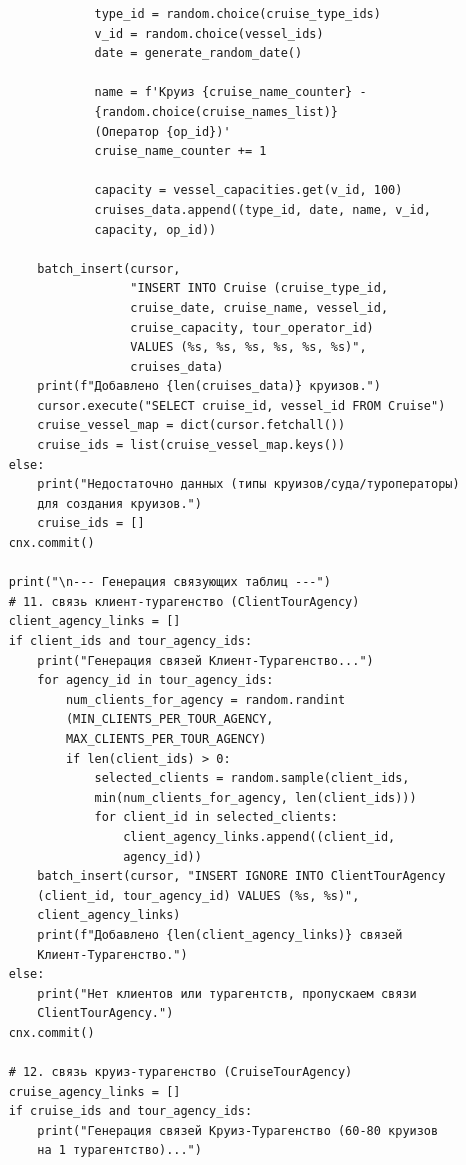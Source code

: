 \documentclass[11pt,a4paper,final]{article}
\begin{document}
{\begin{verbatim}
                type_id = random.choice(cruise_type_ids)
                v_id = random.choice(vessel_ids)
                date = generate_random_date()

                name = f'Круиз {cruise_name_counter} -
                {random.choice(cruise_names_list)} 
                (Оператор {op_id})'
                cruise_name_counter += 1

                capacity = vessel_capacities.get(v_id, 100)
                cruises_data.append((type_id, date, name, v_id, 
                capacity, op_id))

        batch_insert(cursor,
                     "INSERT INTO Cruise (cruise_type_id,
                     cruise_date, cruise_name, vessel_id,
                     cruise_capacity, tour_operator_id)
                     VALUES (%s, %s, %s, %s, %s, %s)",
                     cruises_data)
        print(f"Добавлено {len(cruises_data)} круизов.")
        cursor.execute("SELECT cruise_id, vessel_id FROM Cruise")
        cruise_vessel_map = dict(cursor.fetchall())
        cruise_ids = list(cruise_vessel_map.keys())
    else:
        print("Недостаточно данных (типы круизов/суда/туроператоры)
        для создания круизов.")
        cruise_ids = []
    cnx.commit()

    print("\n--- Генерация связующих таблиц ---")
    # 11. связь клиент-турагенство (ClientTourAgency)
    client_agency_links = []
    if client_ids and tour_agency_ids:
        print("Генерация связей Клиент-Турагенство...")
        for agency_id in tour_agency_ids:
            num_clients_for_agency = random.randint
            (MIN_CLIENTS_PER_TOUR_AGENCY,
            MAX_CLIENTS_PER_TOUR_AGENCY)
            if len(client_ids) > 0:
                selected_clients = random.sample(client_ids,
                min(num_clients_for_agency, len(client_ids)))
                for client_id in selected_clients:
                    client_agency_links.append((client_id,
                    agency_id))
        batch_insert(cursor, "INSERT IGNORE INTO ClientTourAgency 
        (client_id, tour_agency_id) VALUES (%s, %s)", 
        client_agency_links)
        print(f"Добавлено {len(client_agency_links)} связей 
        Клиент-Турагенство.")
    else:
        print("Нет клиентов или турагентств, пропускаем связи
        ClientTourAgency.")
    cnx.commit()

    # 12. связь круиз-турагенство (CruiseTourAgency)
    cruise_agency_links = []
    if cruise_ids and tour_agency_ids:
        print("Генерация связей Круиз-Турагенство (60-80 круизов
        на 1 турагентство)...")


\end{verbatim}}
\end{document}
